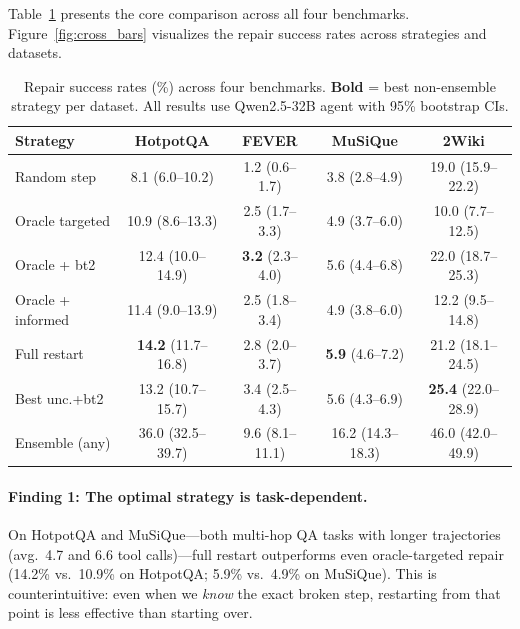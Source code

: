 \documentclass[letterpaper]{article}
\begin{document}
Table~\ref{tab:main_results} presents the core comparison across all four benchmarks. Figure~\ref{fig:cross_bars} visualizes the repair success rates across strategies and datasets.

\begin{table}[t]
\centering
\caption{Repair success rates (\%) across four benchmarks. \textbf{Bold} = best non-ensemble strategy per dataset. All results use Qwen2.5-32B agent with 95\% bootstrap CIs.}
\label{tab:main_results}
\scriptsize
\setlength{\tabcolsep}{3pt}
\begin{tabular}{@{}lcccc@{}}
\toprule
\textbf{Strategy} & \textbf{HotpotQA} & \textbf{FEVER} & \textbf{MuSiQue} & \textbf{2Wiki} \\
\midrule
Random step & 8.1 {\tiny(6.0--10.2)} & 1.2 {\tiny(0.6--1.7)} & 3.8 {\tiny(2.8--4.9)} & 19.0 {\tiny(15.9--22.2)} \\
Oracle targeted & 10.9 {\tiny(8.6--13.3)} & 2.5 {\tiny(1.7--3.3)} & 4.9 {\tiny(3.7--6.0)} & 10.0 {\tiny(7.7--12.5)} \\
Oracle + bt2 & 12.4 {\tiny(10.0--14.9)} & \textbf{3.2} {\tiny(2.3--4.0)} & 5.6 {\tiny(4.4--6.8)} & 22.0 {\tiny(18.7--25.3)} \\
Oracle + informed & 11.4 {\tiny(9.0--13.9)} & 2.5 {\tiny(1.8--3.4)} & 4.9 {\tiny(3.8--6.0)} & 12.2 {\tiny(9.5--14.8)} \\
Full restart & \textbf{14.2} {\tiny(11.7--16.8)} & 2.8 {\tiny(2.0--3.7)} & \textbf{5.9} {\tiny(4.6--7.2)} & 21.2 {\tiny(18.1--24.5)} \\
Best unc.+bt2 & 13.2 {\tiny(10.7--15.7)} & 3.4 {\tiny(2.5--4.3)} & 5.6 {\tiny(4.3--6.9)} & \textbf{25.4} {\tiny(22.0--28.9)} \\
\midrule
Ensemble (any) & 36.0 {\tiny(32.5--39.7)} & 9.6 {\tiny(8.1--11.1)} & 16.2 {\tiny(14.3--18.3)} & 46.0 {\tiny(42.0--49.9)} \\
\bottomrule
\end{tabular}
\end{table}

\paragraph{Finding 1: The optimal strategy is task-dependent.} On HotpotQA and MuSiQue---both multi-hop QA tasks with longer trajectories (avg.\ 4.7 and 6.6 tool calls)---full restart outperforms even oracle-targeted repair (14.2\% vs.\ 10.9\% on HotpotQA; 5.9\% vs.\ 4.9\% on MuSiQue). This is counterintuitive: even when we \emph{know} the exact broken step, restarting from that point is less effective than starting over.
\end{document}

